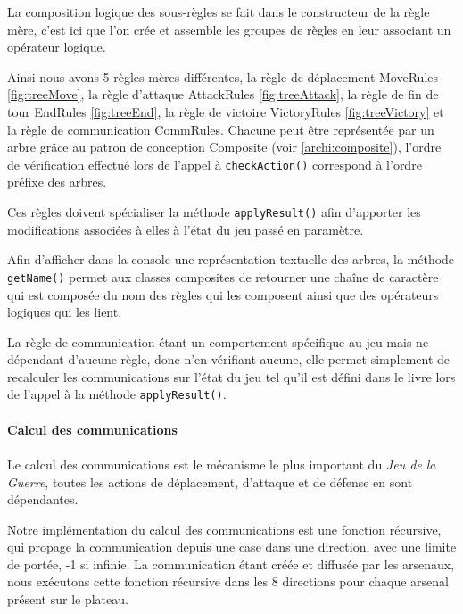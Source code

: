 \documentclass[a4paper]{report}
\begin{document}
La composition logique des sous-règles se fait dans le constructeur de la règle mère, c'est ici que l'on crée et assemble les groupes de règles en leur associant un opérateur logique.

Ainsi nous avons 5 règles mères différentes, la règle de déplacement MoveRules \ref{fig:treeMove}, la règle d'attaque AttackRules \ref{fig:treeAttack}, la règle de fin de tour EndRules \ref{fig:treeEnd}, la règle de victoire VictoryRules \ref{fig:treeVictory} et la règle de communication CommRules. Chacune peut être représentée par un arbre grâce au patron de conception Composite (voir \ref{archi:composite}), l'ordre de vérification effectué lors de l'appel à {\tt checkAction()} correspond à l'ordre préfixe des arbres.

Ces règles doivent spécialiser la méthode {\tt applyResult()} afin d'apporter les modifications associées à elles à l'état du jeu passé en paramètre.

Afin d'afficher dans la console une représentation textuelle des arbres, la méthode \texttt{getName()} permet aux classes composites de retourner une chaîne de caractère qui est composée du nom des règles qui les composent ainsi que des opérateurs logiques qui les lient.

La règle de communication étant un comportement spécifique au jeu mais ne dépendant d'aucune règle, donc n'en vérifiant aucune, elle permet simplement de recalculer les communications sur l'état du jeu tel qu'il est défini dans le livre lors de l'appel à la méthode {\tt applyResult()}.

\paragraph*{Calcul des communications}\label{calculComs}

\paragraph*{}

Le calcul des communications est le mécanisme le plus important du \textit{Jeu de la Guerre}, toutes les actions de déplacement, d'attaque et de défense en sont dépendantes. 

Notre implémentation du calcul des communications est une fonction récursive, qui propage la communication depuis une case dans une direction, avec une limite de portée, -1 si infinie. La communication étant créée et diffusée par les arsenaux, nous exécutons cette fonction récursive dans les 8 directions pour chaque arsenal présent sur le plateau.
\end{document}
